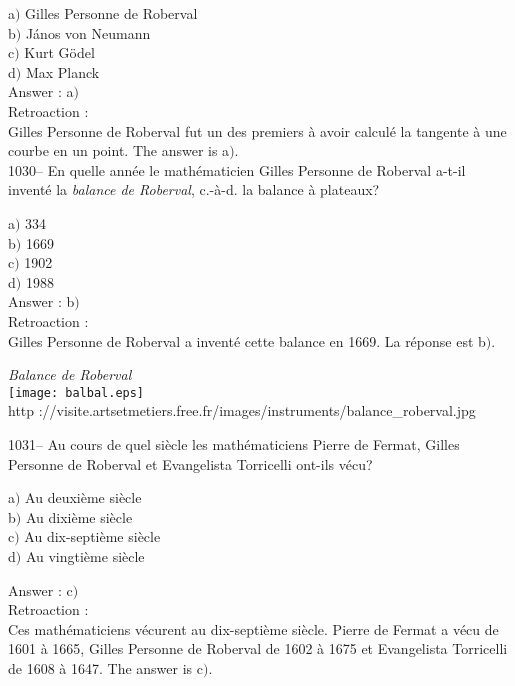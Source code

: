 ﻿\documentclass[letterpaper, 12pt]{article}
\begin{document}
a$)$ Gilles Personne de Roberval  \\
b$)$ J\'anos von Neumann  \\
c$)$ Kurt G\"odel \\
d$)$ Max Planck\\

Answer : a$)$\\

Retroaction :\\
Gilles Personne de Roberval fut un des premiers \`a avoir calcul\'e
la tangente \`a une courbe en un point.
The answer is a$)$.\\

1030-- En quelle ann\'ee le math\'ematicien Gilles Personne de
Roberval a-t-il invent\'e la {\sl balance de Roberval}, c.-\`a-d. la
balance \`a plateaux?

a$)$ 334  \\
b$)$ 1669 \\
c$)$ 1902  \\
d$)$ 1988 \\

Answer : b$)$\\

Retroaction :\\
Gilles Personne de Roberval a invent\'e cette balance en 1669. La r\'eponse
est b$)$.\\

        \begin{center}
        {\sl Balance de Roberval}\\
    \texttt{[image: balbal.eps]}\\
        {\footnotesize http
://visite.artsetmetiers.free.fr/images/instruments/balance\_roberval.jpg}
    \end{center}

1031-- Au cours de quel si\`ecle les math\'ematiciens Pierre de
Fermat, Gilles Personne de Roberval et Evangelista Torricelli
ont-ils v\'ecu?

a$)$ Au deuxi\`eme si\`ecle \\
b$)$ Au dixi\`eme si\`ecle \\
c$)$ Au dix-septi\`eme si\`ecle \\
d$)$ Au vingti\`eme si\`ecle

Answer : c$)$\\

Retroaction : \\
Ces math\'ematiciens v\'ecurent au dix-septi\`eme si\`ecle. Pierre
de Fermat a v\'ecu de 1601 \`a 1665,
Gilles Personne de Roberval de 1602 \`a 1675 et Evangelista Torricelli de
1608 \`a 1647. The answer is c$)$.\\
\end{document}
